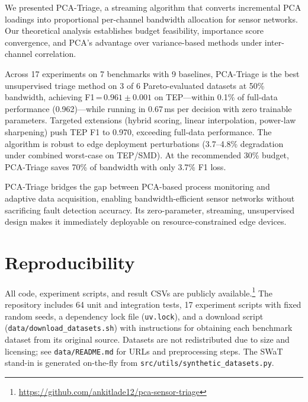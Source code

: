 \documentclass[journal]{IEEEtran}
\begin{document}
We presented PCA-Triage, a streaming algorithm that converts incremental PCA loadings into proportional per-channel bandwidth allocation for sensor networks. Our theoretical analysis establishes budget feasibility, importance score convergence, and PCA's advantage over variance-based methods under inter-channel correlation.

Across 17 experiments on 7 benchmarks with 9 baselines, PCA-Triage is the best unsupervised triage method on 3 of 6 Pareto-evaluated datasets at 50\% bandwidth, achieving F1\,=\,$0.961 \pm 0.001$ on TEP---within 0.1\% of full-data performance (0.962)---while running in 0.67\,ms per decision with zero trainable parameters. Targeted extensions (hybrid scoring, linear interpolation, power-law sharpening) push TEP F1 to 0.970, exceeding full-data performance. The algorithm is robust to edge deployment perturbations (3.7--4.8\% degradation under combined worst-case on TEP/SMD). At the recommended 30\% budget, PCA-Triage saves 70\% of bandwidth with only 3.7\% F1 loss.

PCA-Triage bridges the gap between PCA-based process monitoring and adaptive data acquisition, enabling bandwidth-efficient sensor networks without sacrificing fault detection accuracy. Its zero-parameter, streaming, unsupervised design makes it immediately deployable on resource-constrained edge devices.

\section*{Reproducibility}

All code, experiment scripts, and result CSVs are publicly available.\footnote{\url{https://github.com/ankitlade12/pca-sensor-triage}} The repository includes 64 unit and integration tests, 17 experiment scripts with fixed random seeds, a dependency lock file (\texttt{uv.lock}), and a download script (\texttt{data/download\_datasets.sh}) with instructions for obtaining each benchmark dataset from its original source. Datasets are not redistributed due to size and licensing; see \texttt{data/README.md} for URLs and preprocessing steps. The SWaT stand-in is generated on-the-fly from \texttt{src/utils/synthetic\_datasets.py}.



\end{document}
